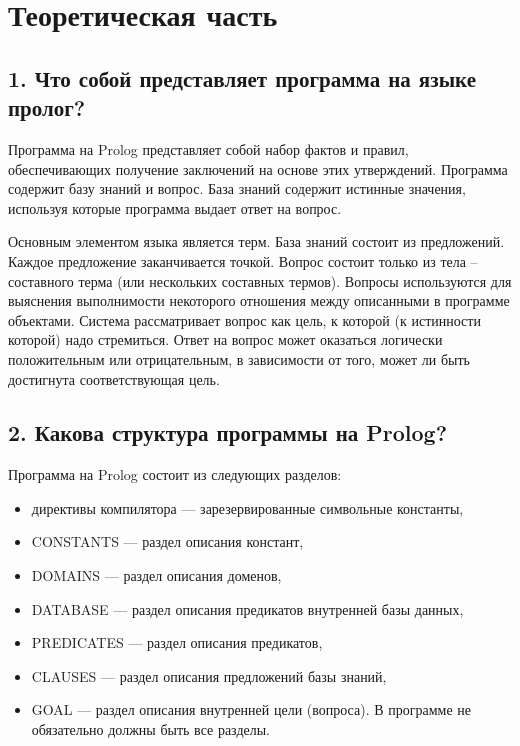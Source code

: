 \documentclass[12pt]{report}
\begin{document}
\chapter*{Теоретическая часть}

\section*{1. Что собой представляет программа на языке пролог?}

Программа на Prolog представляет собой набор фактов и правил, обеспечивающих получение заключений на основе этих утверждений. Программа содержит базу знаний и вопрос. База знаний содержит истинные значения, используя которые программа выдает ответ на вопрос. 

Основным элементом языка является терм. База знаний состоит из предложений. Каждое предложение заканчивается точкой. Вопрос состоит только из тела – составного терма (или нескольких составных термов). Вопросы используются для выяснения выполнимости некоторого отношения между описанными в программе объектами. Система рассматривает вопрос как цель, к которой (к истинности которой) надо стремиться. Ответ на вопрос может оказаться логически положительным или отрицательным, в зависимости от того, может ли быть достигнута соответствующая цель.

\section*{2. Какова структура программы на Prolog?}

Программа на Prolog состоит из следующих разделов:

\begin{itemize}
	\item директивы компилятора — зарезервированные символьные константы,
	\item CONSTANTS — раздел описания констант,
	\item DOMAINS — раздел описания доменов,
	\item DATABASE — раздел описания предикатов внутренней базы данных,
	\item PREDICATES — раздел описания предикатов,
	\item CLAUSES — раздел описания предложений базы знаний,
	\item GOAL — раздел описания внутренней цели (вопроса).
	В программе не обязательно должны быть все разделы.
\end{itemize}
\end{document}
